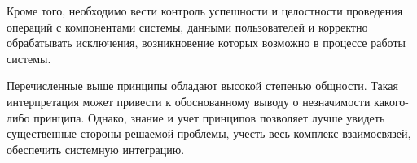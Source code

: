 Кроме того, необходимо вести контроль успешности и целостности проведения операций с компонентами системы, данными пользователей и корректно обрабатывать исключения, возникновение которых возможно в процессе работы системы.

Перечисленные выше принципы обладают высокой степенью общности.
Такая интерпретация может привести к обоснованному выводу о незначимости какого-либо принципа.
Однако, знание и учет принципов позволяет лучше увидеть существенные стороны решаемой проблемы, учесть весь комплекс взаимосвязей, обеспечить системную интеграцию.

\clearpage